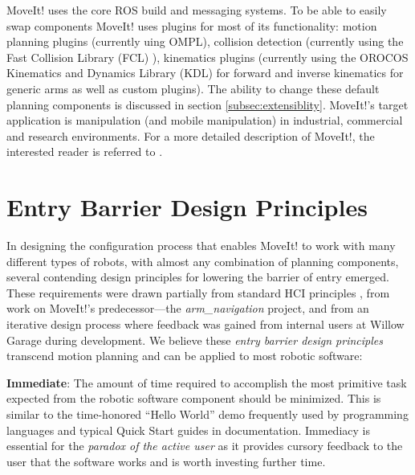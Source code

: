 \documentclass[10pt,journal,compsoc]{joser1}
\begin{document}
{MoveIt! uses the core ROS build and messaging systems. To be able to easily swap components MoveIt! uses plugins for most of its functionality: motion planning plugins (currently uing OMPL\cite{sucan2012the-open-motion-planning-library}), collision detection (currently using the Fast Collision Library (FCL) \cite{fcl}), kinematics plugins (currently using  the OROCOS Kinematics and Dynamics Library (KDL) \cite{kdl} for forward and inverse kinematics for generic arms as well as custom plugins). The ability to change these default planning components is discussed in section \ref{subsec:extensiblity}. MoveIt!'s target application is manipulation (and mobile manipulation) in industrial, commercial and research environments. For a more detailed description of MoveIt!, the interested reader is referred to \cite{moveit}.


\section{Entry Barrier Design Principles}
\label{sec::requirements}

In designing the configuration process that enables MoveIt! to work with many different types of robots, with almost any combination of planning components, several contending design principles for lowering the barrier of entry emerged. These requirements were drawn partially from standard HCI principles \cite{galitz2007essential}, from work on MoveIt!'s predecessor---the \textit{arm\_navigation} project, and from an iterative design process where feedback was gained from internal users at Willow Garage during development. We believe these \textit{entry barrier design principles} transcend motion planning and can be applied to most robotic software:

{\bf Immediate}: The amount of time required to accomplish the most primitive task expected from the robotic software component should be minimized. This is similar to the time-honored ``Hello World'' demo frequently used by programming languages and typical Quick Start guides in documentation. Immediacy is essential for the \textit{paradox of the active user} as it provides cursory feedback to the user that the software works and is worth investing further time.

}
\end{document}
